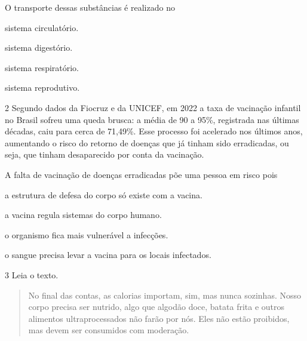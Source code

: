O transporte dessas substâncias é realizado no

\begin{minipage}{.5\textwidth}
\begin{escolha}
\item sistema circulatório.

\item sistema digestório.

\item sistema respiratório.

\item sistema reprodutivo.
\end{escolha}
\end{minipage}


\pagebreak
\num{2} Segundo dados da Fiocruz e da UNICEF, em 2022 a taxa de
vacinação infantil no Brasil sofreu uma queda brusca: a média de 90 a 95\%,
registrada nas últimas décadas, caiu para cerca de 71,49\%. Esse processo
foi acelerado nos últimos anos, aumentando o risco do retorno de doenças
que já tinham sido erradicadas, ou seja, que tinham desaparecido por conta
da vacinação. 

A falta de vacinação de doenças erradicadas põe uma pessoa em risco pois

\begin{escolha}
\item a estrutura de defesa do corpo só existe com a vacina.

\item a vacina regula sistemas do corpo humano.

\item o organismo fica mais vulnerável a infecções.

\item o sangue precisa levar a vacina para os locais infectados.
\end{escolha}



\num{3} Leia o texto.

\begin{quote}
No final das contas, as calorias importam, sim, mas nunca sozinhas.
Nosso corpo precisa ser nutrido, algo que algodão doce, batata frita e
outros alimentos ultraprocessados não farão por nós. Eles não estão
proibidos, mas devem ser consumidos com moderação.

\end{quote}

